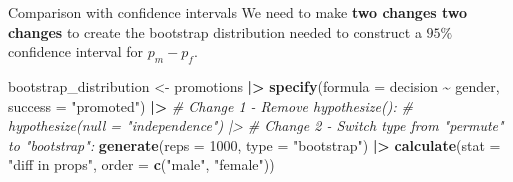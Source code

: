 \documentclass[
  ignorenonframetext,
]{beamer}
\newenvironment{Shaded}{\begin{snugshade}}{\end{snugshade}}
\newcommand{\AttributeTok}[1]{\textcolor[rgb]{0.13,0.29,0.53}{#1}}
\newcommand{\CommentTok}[1]{\textcolor[rgb]{0.56,0.35,0.01}{\textit{#1}}}
\newcommand{\DecValTok}[1]{\textcolor[rgb]{0.00,0.00,0.81}{#1}}
\newcommand{\FunctionTok}[1]{\textcolor[rgb]{0.13,0.29,0.53}{\textbf{#1}}}
\newcommand{\NormalTok}[1]{#1}
\newcommand{\OtherTok}[1]{\textcolor[rgb]{0.56,0.35,0.01}{#1}}
\newcommand{\SpecialCharTok}[1]{\textcolor[rgb]{0.81,0.36,0.00}{\textbf{#1}}}
\newcommand{\StringTok}[1]{\textcolor[rgb]{0.31,0.60,0.02}{#1}}
\begin{document}
\begin{frame}[fragile]{Comparison with confidence intervals}
\label{comparison-with-confidence-intervals-1}
We need to make \textbf{two changes two changes} to create the bootstrap
distribution needed to construct a \(95\%\) confidence interval for
\(p_m-p_f\).

\begin{Shaded}
\begin{Highlighting}[]
\NormalTok{bootstrap\_distribution }\OtherTok{\textless{}{-}}\NormalTok{ promotions }\SpecialCharTok{|\textgreater{}} 
  \FunctionTok{specify}\NormalTok{(}\AttributeTok{formula =}\NormalTok{ decision }\SpecialCharTok{\textasciitilde{}}\NormalTok{ gender, }
          \AttributeTok{success =} \StringTok{"promoted"}\NormalTok{) }\SpecialCharTok{|\textgreater{}} 
  \CommentTok{\# Change 1 {-} Remove hypothesize():}
  \CommentTok{\# hypothesize(null = "independence") |\textgreater{} }
  \CommentTok{\# Change 2 {-} Switch type from "permute" to "bootstrap":}
  \FunctionTok{generate}\NormalTok{(}\AttributeTok{reps =} \DecValTok{1000}\NormalTok{, }\AttributeTok{type =} \StringTok{"bootstrap"}\NormalTok{) }\SpecialCharTok{|\textgreater{}} 
  \FunctionTok{calculate}\NormalTok{(}\AttributeTok{stat =} \StringTok{"diff in props"}\NormalTok{, }
            \AttributeTok{order =} \FunctionTok{c}\NormalTok{(}\StringTok{"male"}\NormalTok{, }\StringTok{"female"}\NormalTok{))}
\end{Highlighting}
\end{Shaded}
\end{frame}
\end{document}
